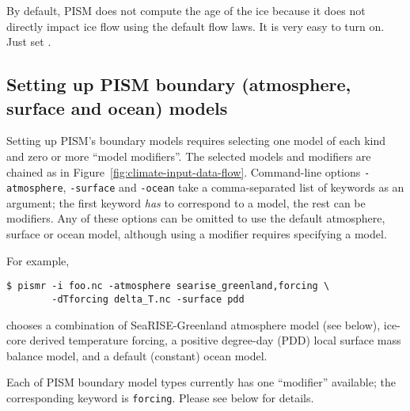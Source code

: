 By default, PISM does not compute the age of the ice because it does not directly impact ice flow using the default flow laws.   It is very easy to turn on.  Just set .


\subsection{Setting up PISM boundary (atmosphere, surface and ocean) models}
\label{sec:boundary-models}

Setting up PISM's boundary models requires selecting one model of each kind and zero or more ``model modifiers''.  The selected models and modifiers are chained as in Figure~\ref{fig:climate-input-data-flow}. Command-line options \texttt{-atmosphere}, \texttt{-surface} and \texttt{-ocean} take a comma-separated list of keywords as an argument; the first keyword \emph{has} to correspond to a model, the rest can be modifiers. Any of these options can be omitted to use the default atmosphere, surface or ocean model, although using a modifier requires specifying a model.

For example,
\begin{verbatim}
$ pismr -i foo.nc -atmosphere searise_greenland,forcing \
        -dTforcing delta_T.nc -surface pdd
\end{verbatim}%
chooses a combination of SeaRISE-Greenland atmosphere model (see below),  ice-core derived temperature forcing, a positive degree-day (PDD) local surface mass balance model, and a default (constant) ocean model.

Each of PISM boundary model types currently has one ``modifier'' available; the corresponding keyword is \texttt{forcing}. Please see below for details.

